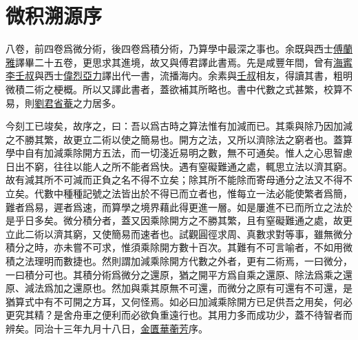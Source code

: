 \chapter {微积溯源序}

  八卷，前四卷爲微分術，後四卷爲積分術，乃算學中最深之事也。余既與西士\uline{傅蘭雅}譯畢二十五卷，更思求其進境，故又與傅君譯此書焉。先是咸豐年間，曾有\uline{海寗}\uline{李壬叔}與西士\uline{偉烈亞力}譯出代一書，流播海内。余素與\uline{壬叔}相友，得讀其書，粗明微積二術之梗概。所以又譯此書者，蓋欲補其所略也。書中代數之式甚繁，校算不易，則\uline{劉君省菴}之力居多。

  今刻工已竣矣，故序之，曰：吾以爲古時之算法惟有加減而已。其乘與除乃因加減之不勝其繁，故更立二術以使之簡易也。開方之法，又所以濟除法之窮者也。蓋算學中自有加減乘除開方五法，而一切淺近易明之數，無不可通矣。惟人之心思智慮日出不窮，往往以能人之所不能者爲快。遇有窒礙難通之處，輒思立法以濟其窮。故有減其所不可減而正負之名不得不立矣；除其所不能除而寄母通分之法又不得不立矣。代數中種種記號之法皆出於不得已而立者也，惟每立一法必能使繁者爲簡，難者爲易，遲者爲速，而算學之境界藉此得更進一層。如是屢進不已而所立之法於是乎日多矣。微分積分者，蓋又因乘除開方之不勝其繁，且有窒礙難通之處，故更立此二術以濟其窮，又使簡易而速者也。試觀圓徑求周、真數求對等事，雖無微分積分之時，亦未嘗不可求，惟須乘除開方數十百次。其難有不可言喻者，不如用微積之法理明而數捷也。然則謂加減乘除開方代數之外者，更有二術焉，一曰微分，一曰積分可也。其積分術爲微分之還原，猶之開平方爲自乘之還原、除法爲乘之還原、減法爲加之還原也。然加與乘其原無不可還，而微分之原有可還有不可還，是猶算式中有不可開之方耳，又何怪焉。如必曰加減乘除開方已足供吾之用矣，何必更究其精？是舍舟車之便利而必欲負重遠行也。其用力多而成功少，蓋不待智者而辨矣。同治十三年九月十八日，\uline{金匱}\uline{華蘅芳}序。